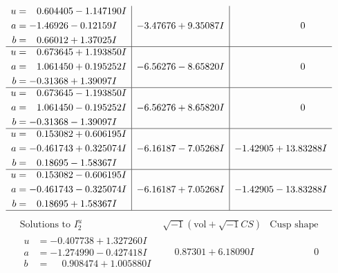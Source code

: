 \documentclass[1p]{elsarticle_modified}
\theoremstyle{definition}
\newcommand{\I}{\sqrt{-1}}
\begin{document}
$$\begin{array}{c|c|c}
\begin{aligned}
u &= \phantom{-}0.604405 - 1.147190 I \\
a &= -1.46926 - 0.12159 I \\
b &= \phantom{-}0.66012 + 1.37025 I\end{aligned}
 & -3.47676 + 9.35087 I & \phantom{-0.000000 } 0 \\ \hline\begin{aligned}
u &= \phantom{-}0.673645 + 1.193850 I \\
a &= \phantom{-}1.061450 + 0.195252 I \\
b &= -0.31368 + 1.39097 I\end{aligned}
 & -6.56276 - 8.65820 I & \phantom{-0.000000 } 0 \\ \hline\begin{aligned}
u &= \phantom{-}0.673645 - 1.193850 I \\
a &= \phantom{-}1.061450 - 0.195252 I \\
b &= -0.31368 - 1.39097 I\end{aligned}
 & -6.56276 + 8.65820 I & \phantom{-0.000000 } 0 \\ \hline\begin{aligned}
u &= \phantom{-}0.153082 + 0.606195 I \\
a &= -0.461743 + 0.325074 I \\
b &= \phantom{-}0.18695 - 1.58367 I\end{aligned}
 & -6.16187 - 7.05268 I & -1.42905 + 13.83288 I \\ \hline\begin{aligned}
u &= \phantom{-}0.153082 - 0.606195 I \\
a &= -0.461743 - 0.325074 I \\
b &= \phantom{-}0.18695 + 1.58367 I\end{aligned}
 & -6.16187 + 7.05268 I & -1.42905 - 13.83288 I\\
 \hline 
 \end{array}$$\newpage$$\begin{array}{c|c|c}  
\text{Solutions to }I^u_{2}& \I (\text{vol} + \sqrt{-1}CS) & \text{Cusp shape}\\
 \hline 
\begin{aligned}
u &= -0.407738 + 1.327260 I \\
a &= -1.274990 - 0.427418 I \\
b &= \phantom{-}0.908474 + 1.005880 I\end{aligned}
 & \phantom{-}0.87301 + 6.18090 I & \phantom{-0.000000 } 0 \\ \hline\begin{aligned}

\end{aligned}
\end{array}$$
\end{document}
